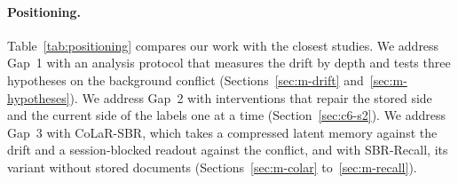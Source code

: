 \paragraph{Positioning.} Table~\ref{tab:positioning} compares our work with the closest
studies. We address Gap~1 with an analysis protocol that measures the drift by depth and
tests three hypotheses on the background conflict (Sections~\ref{sec:m-drift}
and~\ref{sec:m-hypotheses}). We address Gap~2 with interventions that repair the stored
side and the current side of the labels one at a time (Section~\ref{sec:c6-s2}). We address
Gap~3 with CoLaR-SBR, which takes a compressed latent memory against the drift and a
session-blocked readout against the conflict, and with SBR-Recall, its variant without
stored documents (Sections~\ref{sec:m-colar} to~\ref{sec:m-recall}).

